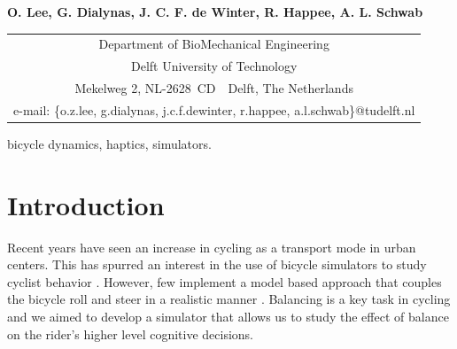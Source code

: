 \documentclass{icsc}
\begin{document}
\begin{center}
\end{center}

\begin{center}
    \normalsize{\bf{O. Lee, G. Dialynas, J. C. F. de Winter, R. Happee, A. L. Schwab}}
\end{center}

\begin{center}
  \begin{tabular}{c}
     Department of BioMechanical Engineering\\
     Delft University of Technology\\
     Mekelweg 2, NL-2628~CD~~Delft, The Netherlands\\
     e-mail: \{o.z.lee, g.dialynas, j.c.f.dewinter, r.happee, a.l.schwab\}@tudelft.nl\\
  \end{tabular}
\end{center}

\begin{keywords}
bicycle dynamics, haptics, simulators.
\end{keywords}

\section{Introduction}
Recent years have seen an increase in cycling as a transport mode in urban centers.
This has spurred an interest in the use of bicycle simulators to study cyclist behavior \cite{caro2015role,
herpers2008fivis, ohern2017validation, plumert2004childrens}.
However, few implement a model based approach that couples the bicycle roll and steer in a
realistic manner \cite{yin2007implementation}.
Balancing is a key task in cycling and we aimed to develop a simulator that allows us to study the effect of balance on
the rider's higher level cognitive decisions.
\end{document}
